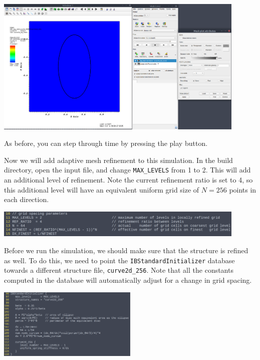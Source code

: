 \documentclass{article}
\begin{document}
\begin{center}
\includegraphics[width=0.9\textwidth]{Graphs/IB-ex1/initial_condition.png}
\end{center}

As before, you can step through time by pressing the play button.

Now we will add adaptive mesh refinement to this simulation. In the build directory, open the input file, and change \verb|MAX_LEVELS| from 1 to 2. This will add an additional level of refinement. Note the current refinement ratio is set to 4, so this additional level will have an equivalent uniform grid size of $N = 256$ points in each direction.

\begin{center}
\includegraphics[width=0.9\textwidth]{Graphs/IB-ex1/max_refinement_2.png}
\end{center}

Before we run the simulation, we should make sure that the structure is refined as well. To do this, we need to point the \verb|IBStandardInitializer| database towards a different structure file, \verb|curve2d_256|. Note that all the constants computed in the database will automatically adjust for a change in grid spacing.

\begin{center}
\includegraphics[width=0.5\textwidth]{Graphs/IB-ex1/IB_StandardInitiailzer_modified_input.png}
\end{center}
\end{document}
